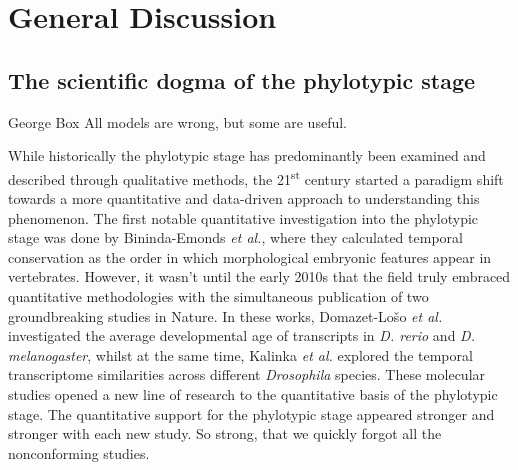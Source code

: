 \chapter{General Discussion}\thumbforchapter
\newpage

\section{The scientific dogma of the phylotypic stage}

\begin{shadequote}[c]{George Box}
All models are wrong, but some are useful.
\end{shadequote}

While historically the phylotypic stage has predominantly been examined and described through qualitative methods, the 21\textsuperscript{st} century started a paradigm shift towards a more quantitative and data-driven approach to understanding this phenomenon\cite{Chan2021}. The first notable quantitative investigation into the phylotypic stage was done by Bininda-Emonds \textit{et al.}, where they calculated temporal conservation as the order in which morphological embryonic features appear in vertebrates\cite{OlafRP2003}. However, it wasn't until the early 2010s that the field truly embraced quantitative methodologies with the simultaneous publication of two groundbreaking studies in Nature\cite{Kalinka2010, DomazetLoso2010}. In these works, Domazet-Lošo \textit{et al.} investigated the average developmental age of transcripts in \textit{D. rerio} and \textit{D. melanogaster}, whilst at the same time, Kalinka \textit{et al.} explored the temporal transcriptome similarities across different \textit{Drosophila} species. These molecular studies opened a new line of research to the quantitative basis of the phylotypic stage. The quantitative support for the phylotypic stage appeared stronger and stronger with each new study. So strong, that we quickly forgot all the nonconforming studies.

